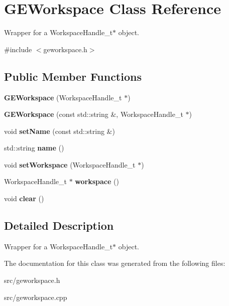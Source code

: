 \hypertarget{class_g_e_workspace}{\section{G\-E\-Workspace Class Reference}
\label{class_g_e_workspace}
}


Wrapper for a Workspace\-Handle\-\_\-t$\ast$ object.  




{\ttfamily \#include $<$geworkspace.\-h$>$}

\subsection*{Public Member Functions}
\begin{DoxyCompactItemize}
\item 
\hypertarget{class_g_e_workspace_aca53a033e0dbba102137830a59947c27}{{\bfseries G\-E\-Workspace} (Workspace\-Handle\-\_\-t $\ast$)}\label{class_g_e_workspace_aca53a033e0dbba102137830a59947c27}

\item 
\hypertarget{class_g_e_workspace_a04fa62c1f18e7ea5beb56c004731616f}{{\bfseries G\-E\-Workspace} (const std\-::string \&, Workspace\-Handle\-\_\-t $\ast$)}\label{class_g_e_workspace_a04fa62c1f18e7ea5beb56c004731616f}

\item 
\hypertarget{class_g_e_workspace_aeea0a0abd2ff8684d39aca1c4fd69405}{void {\bfseries set\-Name} (const std\-::string \&)}\label{class_g_e_workspace_aeea0a0abd2ff8684d39aca1c4fd69405}

\item 
\hypertarget{class_g_e_workspace_a679d97c4b6e78caafb74dd48161b96f1}{std\-::string {\bfseries name} ()}\label{class_g_e_workspace_a679d97c4b6e78caafb74dd48161b96f1}

\item 
\hypertarget{class_g_e_workspace_a97523ad7af7201388ba471ecc4086e72}{void {\bfseries set\-Workspace} (Workspace\-Handle\-\_\-t $\ast$)}\label{class_g_e_workspace_a97523ad7af7201388ba471ecc4086e72}

\item 
\hypertarget{class_g_e_workspace_a95451d82decc36a4bc260d0aee7e8915}{Workspace\-Handle\-\_\-t $\ast$ {\bfseries workspace} ()}\label{class_g_e_workspace_a95451d82decc36a4bc260d0aee7e8915}

\item 
\hypertarget{class_g_e_workspace_ab770508d4d56793d8c99b14714608c80}{void {\bfseries clear} ()}\label{class_g_e_workspace_ab770508d4d56793d8c99b14714608c80}

\end{DoxyCompactItemize}


\subsection{Detailed Description}
Wrapper for a Workspace\-Handle\-\_\-t$\ast$ object. 

The documentation for this class was generated from the following files\-:\begin{DoxyCompactItemize}
\item 
src/geworkspace.\-h\item 
src/geworkspace.\-cpp\end{DoxyCompactItemize}

